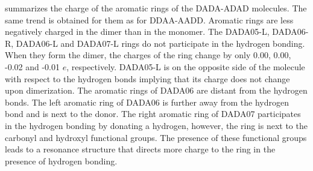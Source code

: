 \documentclass[twoside,twocolumn,9pt]{article}
\begin{document}
 summarizes the charge of the aromatic rings of the DADA-ADAD
molecules.  The same trend is obtained for them as for DDAA-AADD.  Aromatic
rings are less negatively charged in the dimer than in the monomer.  The
DADA05-L, DADA06-R, DADA06-L and DADA07-L rings do not participate in the
hydrogen bonding. When they form the dimer, the charges of the ring change by
only 0.00, 0.00, -0.02 and -0.01 $e$, respectively. DADA05-L is on the opposite
side of the molecule with respect to the hydrogen bonds implying that its
charge does not change upon dimerization. The aromatic rings of DADA06 are
distant from the hydrogen bonds. The left aromatic ring of DADA06 is further
away from the hydrogen bond and is next to the donor. 
The right aromatic ring of DADA07 participates in the hydrogen bonding by
donating a hydrogen, however, the ring is next to the carbonyl and hydroxyl
functional groups. The presence of these functional groups leads to a resonance
structure that directs more charge to the ring in the presence of hydrogen
bonding. 
\end{document}
